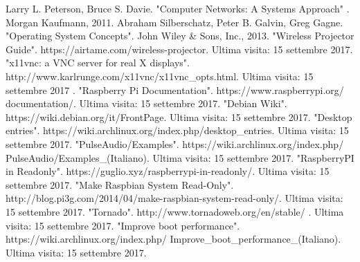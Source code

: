 \documentclass[12pt,a4paper,openright,twoside]{report}
\renewcommand{\chaptermark}[1]{\markboth{\thechapter.\ #1}{}}
\begin{document}
\begin{comment}
\renewcommand{\chaptermark}[1]{\markright{\thechapter \ #1}{}}
\lhead[\fancyplain{}{\bfseries\thepage}]{\fancyplain{}{\bfseries\rightmark}}
\appendix %
\chapter{Appendice} %

\rhead[\fancyplain{}{\bfseries \thechapter \:Appendice}]
{\fancyplain{}{\bfseries\thepage}}

\end{comment}
\begin{thebibliography}{90} %
\rhead[\fancyplain{}{\bfseries \leftmark}]{\fancyplain{}{\bfseries
\thepage}}


 Larry L. Peterson, Bruce S. Davie. "Computer Networks: A Systems Approach" . Morgan Kaufmann, 2011.
 Abraham Silberschatz, Peter B. Galvin, Greg Gagne. "Operating System Concepts". John Wiley \& Sons, Inc., 2013. 
 "Wireless Projector Guide". https://airtame.com/wireless-projector. Ultima visita: 15 settembre 2017.
 "x11vnc: a VNC server for real X displays". http://www.karlrunge.com/x11vnc/x11vnc\_opts.html. Ultima visita: 15 settembre 2017 .
 "Raspberry Pi Documentation". https://www.raspberrypi.org/
documentation/. Ultima visita: 15 settembre 2017.
 "Debian Wiki". https://wiki.debian.org/it/FrontPage. Ultima visita: 15 settembre 2017.
 "Desktop entries". https://wiki.archlinux.org/index.php/desktop\_entries. Ultima visita: 15 settembre 2017.
 "PulseAudio/Examples". https://wiki.archlinux.org/index.php/
PulseAudio/Examples\_(Italiano). Ultima visita: 15 settembre 2017.
 "RaspberryPI in Readonly". https://guglio.xyz/raspberrypi-in-readonly/. Ultima visita: 15 settembre 2017.
 "Make Raspbian System Read-Only". http://blog.pi3g.com/2014/04/make-raspbian-system-read-only/. Ultima visita: 15 settembre 2017.
 "Tornado". http://www.tornadoweb.org/en/stable/ . Ultima visita: 15 settembre 2017.
 "Improve boot performance". https://wiki.archlinux.org/index.php/
Improve\_boot\_performance\_(Italiano). Ultima visita: 15 settembre 2017.

\end{thebibliography}
\clearpage{\pagestyle{empty}\cleardoublepage}
\end{document}
